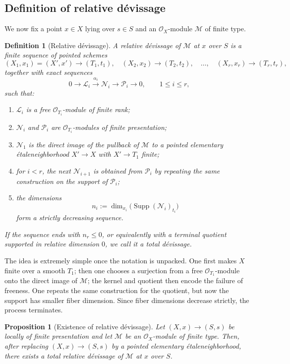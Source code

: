 \documentclass[11pt,oneside]{article}
\newtheorem{proposition}[theorem]{Proposition}
\newtheorem{definition}[theorem]{Definition}
\newcommand{\Lcal}{\mathcal L}
\newcommand{\M}{\mathcal M}
\newcommand{\N}{\mathcal N}
\newcommand{\Pcal}{\mathcal P}
\newcommand{\OO}{\mathcal O}
\newcommand{\Supp}{\operatorname{Supp}}
\newcommand{\etale}{\'etale}
\begin{document}
\subsection{Definition of relative d\'evissage}

We now fix a point $x\in X$ lying over $s\in S$ and an $\OO_X$-module $\M$ of finite type.

\begin{definition}[Relative d\'evissage]\label{def:devissage}
A \emph{relative d\'evissage} of $\M$ at $x$ over $S$ is a finite sequence of pointed schemes
\[
(X_1,x_1)=(X',x')\to (T_1,t_1),\quad (X_2,x_2)\to (T_2,t_2),\quad \dots,\quad (X_r,x_r)\to (T_r,t_r),
\]
together with exact sequences
\[
0\to \Lcal_i\xrightarrow{\alpha_i}\N_i\to \Pcal_i\to 0,
\qquad 1\le i\le r,
\]
such that:
\begin{enumerate}[label=\textup{(\roman*)}]
  \item $\Lcal_i$ is a free $\OO_{T_i}$-module of finite rank;
  \item $\N_i$ and $\Pcal_i$ are $\OO_{T_i}$-modules of finite presentation;
  \item $\N_1$ is the direct image of the pullback of $\M$ to a pointed elementary \etale neighborhood $X'\to X$ with $X'\to T_1$ finite;
  \item for $i<r$, the next $\N_{i+1}$ is obtained from $\Pcal_i$ by repeating the same construction on the support of $\Pcal_i$;
  \item the dimensions
  \[
  n_i:=\dim_{x_i}\bigl(\Supp(\N_i)_{t_i}\bigr)
  \]
  form a strictly decreasing sequence.
\end{enumerate}
If the sequence ends with $n_r\le 0$, or equivalently with a terminal quotient supported in relative dimension $0$, we call it a \emph{total d\'evissage}.
\end{definition}

The idea is extremely simple once the notation is unpacked.  One first makes $X$ finite over a smooth $T_1$; then one chooses a surjection from a free $\OO_{T_1}$-module onto the direct image of $\M$; the kernel and quotient then encode the failure of freeness.  One repeats the same construction for the quotient, but now the support has smaller fiber dimension.  Since fiber dimensions decrease strictly, the process terminates.

\begin{proposition}[Existence of relative d\'evissage]\label{prop:exist-dev}
Let $(X,x)\to(S,s)$ be locally of finite presentation and let $\M$ be an $\OO_X$-module of finite type.  Then, after replacing $(X,x)\to(S,s)$ by a pointed elementary \etale neighborhood, there exists a total relative d\'evissage of $\M$ at $x$ over $S$.
\end{proposition}
\end{document}
